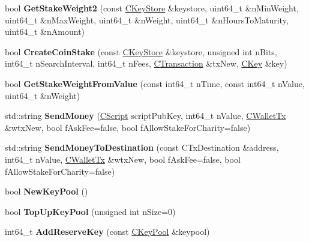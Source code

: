 \begin{DoxyCompactItemize}
bool {\bfseries Get\+Stake\+Weight2} (const \mbox{\hyperlink{class_c_key_store}{C\+Key\+Store}} \&keystore, uint64\+\_\+t \&n\+Min\+Weight, uint64\+\_\+t \&n\+Max\+Weight, uint64\+\_\+t \&n\+Weight, uint64\+\_\+t \&n\+Hours\+To\+Maturity, uint64\+\_\+t \&n\+Amount)
\item 
\mbox{\label{class_c_wallet_a8ec5f7e1dfd811ff2e3062f953a7eddc}} 
bool {\bfseries Create\+Coin\+Stake} (const \mbox{\hyperlink{class_c_key_store}{C\+Key\+Store}} \&keystore, unsigned int n\+Bits, int64\+\_\+t n\+Search\+Interval, int64\+\_\+t n\+Fees, \mbox{\hyperlink{class_c_transaction}{C\+Transaction}} \&tx\+New, \mbox{\hyperlink{class_c_key}{C\+Key}} \&key)
\item 
\mbox{\label{class_c_wallet_a84577c63ba9daf561fc54150c01316e0}} 
bool {\bfseries Get\+Stake\+Weight\+From\+Value} (const int64\+\_\+t n\+Time, const int64\+\_\+t n\+Value, uint64\+\_\+t \&n\+Weight)
\item 
\mbox{\label{class_c_wallet_a9aed2013e3dbadade3a95d8a5fe0985f}} 
std\+::string {\bfseries Send\+Money} (\mbox{\hyperlink{class_c_script}{C\+Script}} script\+Pub\+Key, int64\+\_\+t n\+Value, \mbox{\hyperlink{class_c_wallet_tx}{C\+Wallet\+Tx}} \&wtx\+New, bool f\+Ask\+Fee=false, bool f\+Allow\+Stake\+For\+Charity=false)
\item 
\mbox{\label{class_c_wallet_a7d706d0d4c4ed7b3cd79cd4f5f4ad722}} 
std\+::string {\bfseries Send\+Money\+To\+Destination} (const C\+Tx\+Destination \&address, int64\+\_\+t n\+Value, \mbox{\hyperlink{class_c_wallet_tx}{C\+Wallet\+Tx}} \&wtx\+New, bool f\+Ask\+Fee=false, bool f\+Allow\+Stake\+For\+Charity=false)
\item 
\mbox{\label{class_c_wallet_a7353ba1e79fc4167fbfbe79b41698fa7}} 
bool {\bfseries New\+Key\+Pool} ()
\item 
\mbox{\label{class_c_wallet_aeeeca131336b2ec20cede9a2fccc203a}} 
bool {\bfseries Top\+Up\+Key\+Pool} (unsigned int n\+Size=0)
\item 
\mbox{\label{class_c_wallet_afecefdad197b3b021139cef1fd0e7a9b}} 
int64\+\_\+t {\bfseries Add\+Reserve\+Key} (const \mbox{\hyperlink{class_c_key_pool}{C\+Key\+Pool}} \&keypool)

\end{DoxyCompactItemize}

